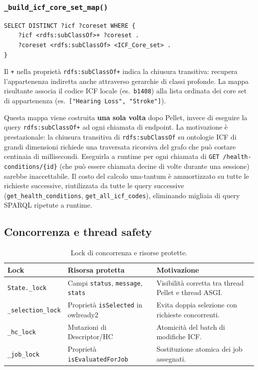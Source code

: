 \documentclass[a4paper,12pt]{article}
\begin{document}
\subsubsection{{\small\texttt{\_build\_icf\_\allowbreak{}core\_set\_map()}}}

\begin{lstlisting}[caption={SPARQL per la mappa ICF code $\rightarrow$ Core Set.}]
SELECT DISTINCT ?icf ?coreset WHERE {
    ?icf <rdfs:subClassOf>+ ?coreset .
    ?coreset <rdfs:subClassOf> <ICF_Core_set> .
}
\end{lstlisting}

\noindent Il \texttt{+} nella propriet\`{a} \texttt{rdfs:subClassOf+} indica la
chiusura transitiva: recupera l'appartenenza indiretta anche attraverso
gerarchie di classi profonde. La mappa risultante associa il codice ICF
locale (es.\ \texttt{b1408}) alla lista ordinata dei core set di
appartenenza (es.\ \texttt{["Hearing Loss", "Stroke"]}).

Questa mappa viene costruita \textbf{una sola volta} dopo Pellet, invece
di eseguire la query \texttt{rdfs:subClassOf+} ad ogni chiamata di endpoint.
La motivazione \`{e} prestazionale: la chiusura transitiva di
\texttt{rdfs:subClassOf} su ontologie ICF di grandi dimensioni richiede
una traversata ricorsiva del grafo che pu\`{o} costare centinaia di
millisecondi. Eseguirla a runtime per ogni chiamata di
\texttt{GET /health-conditions/\{id\}} (che pu\`{o} essere chiamata
decine di volte durante una sessione) sarebbe inaccettabile. Il costo
del calcolo una-tantum \`{e} ammortizzato su tutte le richieste successive,
riutilizzata da tutte le query successive (\texttt{get\_health\_conditions},
\texttt{get\_all\_icf\_codes}), eliminando migliaia di query SPARQL
ripetute a runtime.

\subsection{Concorrenza e thread safety}

\begin{table}[H]
\centering
\caption{Lock di concorrenza e risorse protette.}
\begin{tabular}{L{4cm} L{4cm} L{4.5cm}}
\toprule
\textbf{Lock} & \textbf{Risorsa protetta} & \textbf{Motivazione} \\
\midrule
\texttt{State.\_lock} &
  Campi \texttt{status}, \texttt{message}, \texttt{stats} &
  Visibilit\`{a} corretta tra thread Pellet e thread ASGI. \\[4pt]
\texttt{\_selection\_lock} &
  Propriet\`{a} \texttt{isSelected} in owlready2 &
  Evita doppia selezione con richieste concorrenti. \\[4pt]
\texttt{\_hc\_lock} &
  Mutazioni di Descriptor/HC &
  Atomicit\`{a} del batch di modifiche ICF. \\[4pt]
\texttt{\_job\_lock} &
  Propriet\`{a} \texttt{isEvaluatedForJob} &
  Sostituzione atomica dei job assegnati. \\
\bottomrule
\end{tabular}
\end{table}
\end{document}
